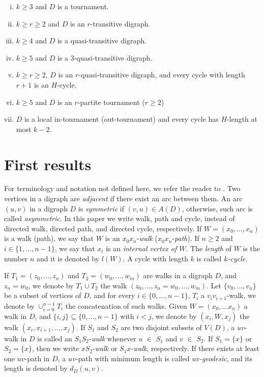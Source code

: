 \documentclass[10pt,a4paper]{article}
\begin{document}
\begin{enumerate}[(i)]
\item $k \geq 3$ and $D$ is a tournament.

\item $k \geq r \geq 2$ and $D$ is an $r$-transitive digraph.

\item $k \geq 4$ and $D$ is a quasi-transitive digraph.

\item $k \geq 5$ and $D$ is a $3$-quasi-transitive digraph.

\item $k \geq r \geq 2$, $D$ is an $r$-quasi-transitive digraph, and every cycle with length $r+1$ is an $H$-cycle.

\item $k \geq 5$ and $D$ is an $r$-partite tournament ($r \geq 2$)

\item $D$ is a local in-tournament (out-tournament) and every cycle has $H$-length at most $k-2$.
\end{enumerate}

 

\section{First results}

For terminology and notation not defined here, we refer the reader to  \cite{1}. Two vertices in a digraph are \textit{adjacent} if there exist an arc between them.  An arc $(u,v)$ in a digraph $D$ is \emph{symmetric} if $(v,u) \in A(D)$, otherwise, such arc is called \emph{asymmetric}. In this paper we write walk, path and cycle, instead of directed walk, directed path, and directed cycle, respectively.
 If $W=(x_{0}, \ldots , x_{n})$ is a walk (path), we say that $W$ is an $x_0x_n$-\emph{walk} ($x_0x_n$-\emph{path}). If $n \geq 2$ and $i \in \{ 1, \ldots , n-1\}$, we say that $x_{i}$ is an \emph{internal vertex of $W$}.  The \emph{length} of $W$ is the number $n$ and it is denoted by $l(W)$. A cycle with length $k$ is called \emph{$k$-cycle.}
 
If $T_{1}=(z_{0}, \ldots , z_{n})$ and $T_{2}=(w_{0}, \ldots , w_{m})$ are walks in a digraph $D$, and $z_{n}=w_{0}$, we denote by $T_{1} \cup T_{2}$ the walk $(z_{0}, \ldots , z_{n} = w_{0}, \ldots , w_{m})$.
 Let $\{ v_{0}, \ldots , v_{n} \}$ be a subset of vertices of $D$, and for every $i \in \{0, \ldots , n-1\}$, $T_{i}$ a $v_{i}v_{i+1}$-walk, we denote by $\cup_{i=0}^{n-1} T_{i}$ the concatenation of such walks.
  Given $W=(x_{0}, \ldots x_{n})$  a walk in $D$, and $\{i, j \} \subseteq \{0, \ldots , n-1 \}$ with $i < j$, we denote by $(x_{i},W, x_{j})$ the walk $(x_{i}, x_{i+1}, \ldots , x_{j})$.
If $S_1$ and $S_2$ are two disjoint subsets of  $V(D)$, a $uv$-walk  in  $D$ is called an $S_1S_2$-\emph{walk} whenever $u$ $\in$ $S_1$ and $v$ $\in$ $S_2$. If $S_1 = \{x\}$ or $S_2 = \{x\}$, then we write $xS_2$-\emph{walk} or $S_1x$-\emph{walk}, respectively. If there exists at least one $uv$-path in $D$, a $uv$-path with minimum length is called \emph{$uv$-geodesic}, and its length is denoted by $d_{D}(u,v)$. 
\end{document}
